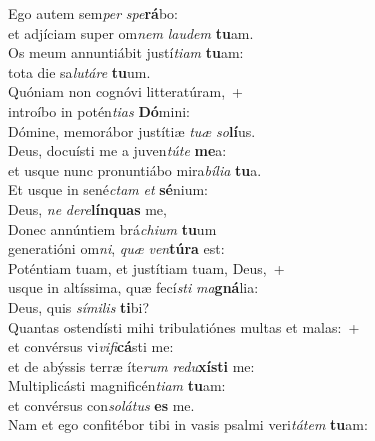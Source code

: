 \evenverse Ego autem sem\textit{per} \textit{spe}\textbf{rá}bo:~\*\\
\evenverse et adjíciam super om\textit{nem} \textit{lau}\textit{dem} \textbf{tu}am.\\
\oddverse Os meum annuntiábit justí\textit{ti}\textit{am} \textbf{tu}am:~\*\\
\oddverse tota die sa\textit{lu}\textit{tá}\textit{re} \textbf{tu}um.\\
\evenverse Quóniam non cognóvi litteratúram,~+\\
\evenverse  introíbo in potén\textit{ti}\textit{as} \textbf{Dó}mini:~\*\\
\evenverse Dómine, memorábor justítiæ \textit{tu}\textit{æ} \textit{so}\textbf{lí}us.\\
\oddverse Deus, docuísti me a juven\textit{tú}\textit{te} \textbf{me}a:~\*\\
\oddverse et usque nunc pronuntiábo mira\textit{bí}\textit{li}\textit{a} \textbf{tu}a.\\
\evenverse Et usque in sené\textit{ctam} \textit{et} \textbf{sé}nium:~\*\\
\evenverse Deus, \textit{ne} \textit{de}\textit{re}\textbf{lín}\textbf{quas} me,\\
\oddverse Donec annúntiem brá\textit{chi}\textit{um} \textbf{tu}um~\*\\
\oddverse generatióni om\textit{ni}, \textit{quæ} \textit{ven}\textbf{tú}\textbf{ra} est:\\
\evenverse Poténtiam tuam, et justítiam tuam, Deus,~+\\
\evenverse  usque in altíssima, quæ fecí\textit{sti} \textit{ma}\textbf{gná}lia:~\*\\
\evenverse Deus, quis \textit{sí}\textit{mi}\textit{lis} \textbf{ti}bi?\\
\oddverse Quantas ostendísti mihi tribulatiónes multas et malas:~+\\
\oddverse  et convérsus vi\textit{vi}\textit{fi}\textbf{cá}sti me:~\*\\
\oddverse et de abýssis terræ íte\textit{rum} \textit{re}\textit{du}\textbf{xí}\textbf{sti} me:\\
\evenverse Multiplicásti magnificén\textit{ti}\textit{am} \textbf{tu}am:~\*\\
\evenverse et convérsus con\textit{so}\textit{lá}\textit{tus} \textbf{es} me.\\
\oddverse Nam et ego confitébor tibi in vasis psalmi veri\textit{tá}\textit{tem} \textbf{tu}am:~\*\\
